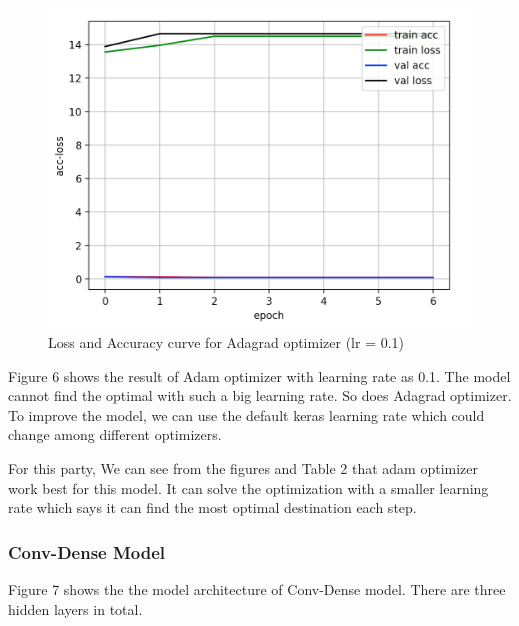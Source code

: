 \documentclass{article}
\begin{document}
\begin{figure}[htbp]
    \centering
    \includegraphics[scale = 0.5]{adam.png}
    \caption{Loss and Accuracy curve for Adagrad optimizer (lr = 0.1)}
    \label{fig6}
\end{figure}

Figure 6 shows the result of Adam optimizer with learning rate as 0.1. The model cannot find the optimal with such a big learning rate. So does Adagrad optimizer. To improve the model, we can use the default keras learning rate which could change among different optimizers.

For this party, We can see from the figures and Table 2 that adam optimizer work best for this model. It can solve the optimization with a smaller learning rate which says it can find the most optimal destination each step. 



\subsubsection*{Conv-Dense Model}

Figure 7 shows the the model architecture of Conv-Dense model. There are three hidden layers in total. 
\end{document}
